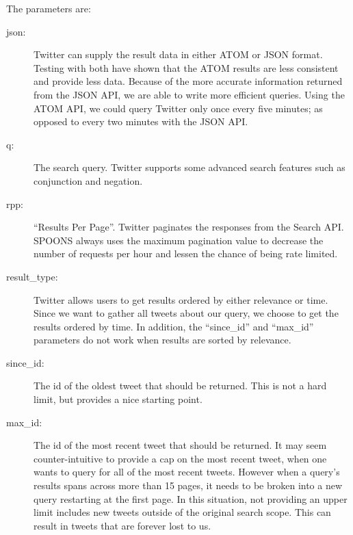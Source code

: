\documentclass[12pt]{ucthesis}
\begin{document}
The parameters are:

\begin{description}

\item[json:]
Twitter can supply the result data in either ATOM or JSON format. Testing with both have shown that the ATOM
results are less consistent and provide less data. Because of the more accurate information returned from the JSON
API, we are able to write more efficient queries. Using the ATOM API, we could query Twitter only once every five
minutes; as opposed to every two minutes with the JSON API.

\item[q:]
The search query. Twitter supports some advanced search features such as conjunction and negation.

\item[rpp:]
``Results Per Page''. Twitter paginates the responses from the Search API. SPOONS always uses the maximum pagination value to decrease the number of requests per hour and lessen the chance of being rate limited.

\item[result\_type:]
Twitter allows users to get results ordered by either relevance or time. Since we want to gather all tweets about
our query, we choose to get the results ordered by time. In addition, the ``since\_id'' and ``max\_id''
parameters do not work when results are sorted by relevance.

\item[since\_id:]
The id of the oldest tweet that should be returned. This is not a hard limit, but provides a nice starting point.

\item[max\_id:]
The id of the most recent tweet that should be returned. It may seem counter-intuitive to provide a cap on the
most recent tweet, when one wants to query for all of the most recent tweets. However when a query's results spans across
more than 15 pages, it needs to be broken into a new query restarting at the first page. In this situation,
not providing an upper limit includes new tweets outside of the original search scope. This can result in tweets that are forever lost to us.

\end{description}
\end{document}

